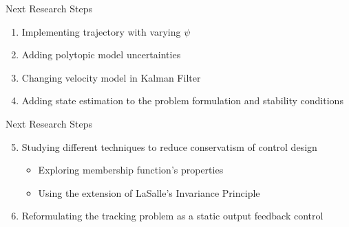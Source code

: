 \begin{frame}{Next Research Steps}
	\begin{enumerate}
		\item Implementing trajectory with varying $\psi$
		
		\item Adding polytopic model uncertainties
		
		\item Changing velocity model in Kalman Filter
		
    	\item Adding state estimation to the problem formulation and stability conditions
	\end{enumerate}
	\end{frame}

\begin{frame}{Next Research Steps}
	\begin{enumerate} 
			\setcounter{enumi}{4}
    	\item Studying different techniques to reduce conservatism of control design
    	\begin{itemize} \vspace{-0.45cm}
    		\item Exploring membership function's properties
    		\item Using the extension of LaSalle's Invariance Principle
    	\end{itemize}
    	
    	\item Reformulating the tracking problem as a static output feedback control

	\end{enumerate}
\end{frame}


